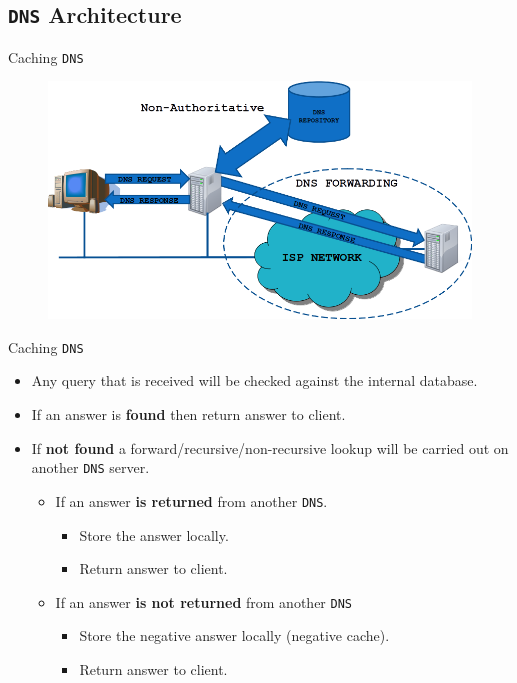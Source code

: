 \documentclass{beamer}
\begin{document}
\subsection{\texttt{DNS} Architecture}
\begin{frame}{Caching \texttt{DNS}}
  \begin{figure}
    \begin{center}
      \includegraphics[width=1\linewidth]{cachingdns.png}
    \end{center}
  \end{figure}
\end{frame}

\begin{frame}{Caching \texttt{DNS}}
  \begin{itemize}
    \item Any query that is received will be checked against the internal database.
    \item If an answer is \textbf{found} then return answer to client.
    \item If \textbf{not found} a forward/recursive/non-recursive lookup will be carried out on another \texttt{DNS} server.
      \begin{itemize}
        \item If an answer \textbf{is returned} from another \texttt{DNS}.
          \begin{itemize}
            \item Store the answer locally.
            \item Return answer to client.
          \end{itemize}
        \item If an answer \textbf{is not returned} from another \texttt{DNS}
        \begin{itemize}
          \item Store the negative answer locally (negative cache).
          \item Return answer to client.
        \end{itemize}
      \end{itemize}
  \end{itemize} 
\end{frame}
\end{document}

